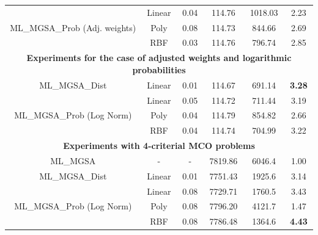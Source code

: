 \documentclass[runningheads]{llncs}
\begin{document}
\begin{table}[ht]
{\begin{tabular}{cccccc}
\multirow{3}{*}{ML\_MGSA\_Prob (Adj. weights)}                             & Linear     & 0.04 & 114.76  & 1018.03    & 2.23           \\
                                                                           & Poly       & 0.08 & 114.73  & 844.66    & 2.69           \\
                                                                           & RBF        & 0.03 & 114.76  & 796.74    & 2.85           \\ \hline
\multicolumn{6}{c}{\textbf{Experiments for the case of adjusted weights and logarithmic probabilities}}                                               \\ \hline
ML\_MGSA\_Dist                                                             & Linear     & 0.01 & 114.67  & 691.14    & \textbf{3.28}  \\
\multirow{3}{*}{ML\_MGSA\_Prob (Log Norm)}                                 & Linear     & 0.05 & 114.72  & 711.44    & 3.19           \\
                                                                           & Poly       & 0.04 & 114.79  & 854.82    & 2.66           \\
                                                                           & RBF        & 0.04 & 114.74  & 704.99    & 3.22           \\ \hline
\multicolumn{6}{c}{\textbf{Experiments with 4-criterial MCO problems}}                                                                \\ \hline
ML\_MGSA                                                                   & -          & -    & 7819.86 & 6046.4    & 1.00           \\ \hline
ML\_MGSA\_Dist                                                             & Linear     & 0.01 & 7751.43 & 1925.6    & 3.14           \\
\multirow{3}{*}{ML\_MGSA\_Prob (Log Norm)}                                 & Linear     & 0.08 & 7729.71 & 1760.5    & 3.43           \\
                                                                           & Poly       & 0.08 & 7796.20 & 4121.7    & 1.47           \\
                                                                           & RBF        & 0.08 & 7786.48 & 1364.6    & \textbf{4.43}  \\ \hline
\end{tabular}%
}
\end{table}
\end{document}
